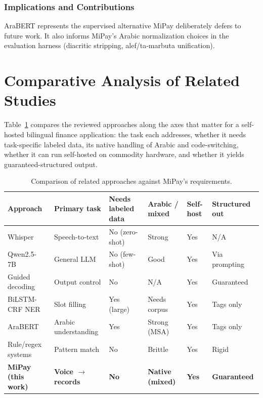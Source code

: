 \subsubsection{Implications and Contributions}
AraBERT represents the supervised alternative MiPay deliberately defers to future
work. It also informs MiPay's Arabic normalization choices in the evaluation
harness (diacritic stripping, alef/ta-marbuta unification).

\section{Comparative Analysis of Related Studies}

Table~\ref{tab:related-comparison} compares the reviewed approaches along the
axes that matter for a self-hosted bilingual finance application: the task each
addresses, whether it needs task-specific labeled data, its native handling of
Arabic and code-switching, whether it can run self-hosted on commodity hardware,
and whether it yields guaranteed-structured output.

\begin{table}[H]
\centering
\caption{Comparison of related approaches against MiPay's requirements.}
\label{tab:related-comparison}
\small
\renewcommand{\arraystretch}{1.3}
\setlength{\tabcolsep}{4pt}
\begin{tabular}{
  >{\raggedright\arraybackslash}p{2.4cm}
  >{\raggedright\arraybackslash}p{1.7cm}
  >{\raggedright\arraybackslash}p{2.1cm}
  >{\centering\arraybackslash}p{1.6cm}
  >{\centering\arraybackslash}p{1.4cm}
  >{\centering\arraybackslash}p{1.9cm}
}
\toprule
\textbf{Approach} & \textbf{Primary task} & \textbf{Needs labeled data} & \textbf{Arabic / mixed} & \textbf{Self-host} & \textbf{Structured out} \\
\midrule
Whisper~\cite{radford2023whisper} & Speech-to-text & No (zero-shot) & Strong & Yes & N/A \\
Qwen2.5-7B~\cite{qwen2024qwen25} & General LLM & No (few-shot) & Good & Yes & Via prompting \\
Guided decoding~\cite{willard2023outlines} & Output control & No & N/A & Yes & Guaranteed \\
BiLSTM-CRF NER~\cite{lample2016ner} & Slot filling & Yes (large) & Needs corpus & Yes & Tags only \\
AraBERT~\cite{antoun2020arabert} & Arabic understanding & Yes & Strong (MSA) & Yes & Tags only \\
Rule/regex systems & Pattern match & No & Brittle & Yes & Rigid \\
\midrule
\textbf{MiPay (this work)} & \textbf{Voice $\rightarrow$ records} & \textbf{No} & \textbf{Native (mixed)} & \textbf{Yes} & \textbf{Guaranteed} \\
\bottomrule
\end{tabular}
\end{table}

